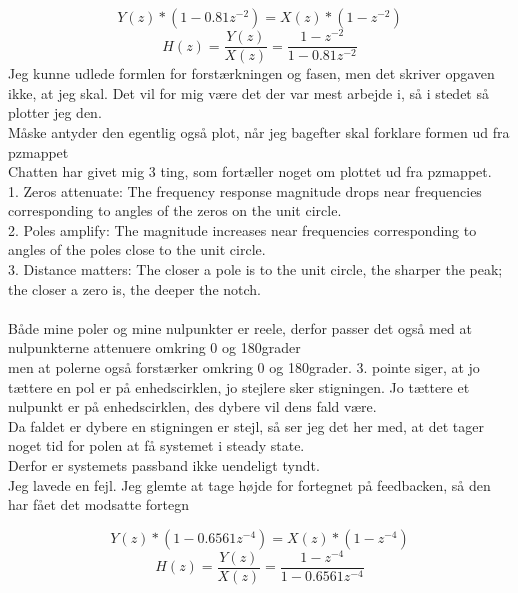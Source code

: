 \begin{Opgaver}
\begin{kapitel}
\begin{Opgave}
\begin{UnderOpgave}[\text{$y[n] = x[n] - x[n - 2] - 0.81y[n - 2]$}]
                \[Y(z)*(1 - 0.81z^{-2}) = X(z)*(1 - z^{-2})\]
                \[H(z) = \frac{Y(z)}{X(z)} = \frac{1 - z^{-2}}{1 - 0.81z^{-2}}\]
                Jeg kunne udlede formlen for forstærkningen og fasen, men det skriver opgaven ikke, at jeg skal. 
                Det vil for mig være det der var mest arbejde i, så i stedet så plotter jeg den. \\
                Måske antyder den egentlig også plot, når jeg bagefter skal forklare formen ud fra pzmappet\\
                
                Chatten har givet mig 3 ting, som fortæller noget om plottet ud fra pzmappet. \\
                1.	Zeros attenuate: The frequency response magnitude drops near frequencies corresponding to angles of the zeros on the unit circle.\\
	            2.	Poles amplify: The magnitude increases near frequencies corresponding to angles of the poles close to the unit circle.\\
	            3.	Distance matters: The closer a pole is to the unit circle, the sharper the peak; the closer a zero is, the deeper the notch.\\
                \\ 
                Både mine poler og mine nulpunkter er reele, derfor passer det også med at nulpunkterne attenuere omkring 0 og 180grader\\
                men at polerne også forstærker omkring 0 og 180grader. 
                3. pointe siger, at jo tættere en pol er på enhedscirklen, jo stejlere sker stigningen. Jo tættere et nulpunkt er på enhedscirklen, des dybere vil dens fald være. \\
                Da faldet er dybere en stigningen er stejl, så ser jeg det her med, at det tager noget tid for polen at få systemet i steady state. \\
                Derfor er systemets passband ikke uendeligt tyndt.\\
                \color{red}
                Jeg lavede en fejl. Jeg glemte at tage højde for fortegnet på feedbacken, så den har fået det modsatte fortegn
                \color{black}
            \end{UnderOpgave}
            \begin{UnderOpgave}[\text{$y[n] = x[n] - x[n - 4] + 0.6561y[n - 4]$}]
                \[Y(z)*(1 - 0.6561z^{-4}) = X(z) * (1 - z^{-4})\]
                \[H(z) = \frac{Y(z)}{X(z)} = \frac{1 - z^{-4}}{1 - 0.6561z^{-4}}\]

\end{UnderOpgave}
\end{Opgave}
\end{kapitel}
\end{Opgaver}
